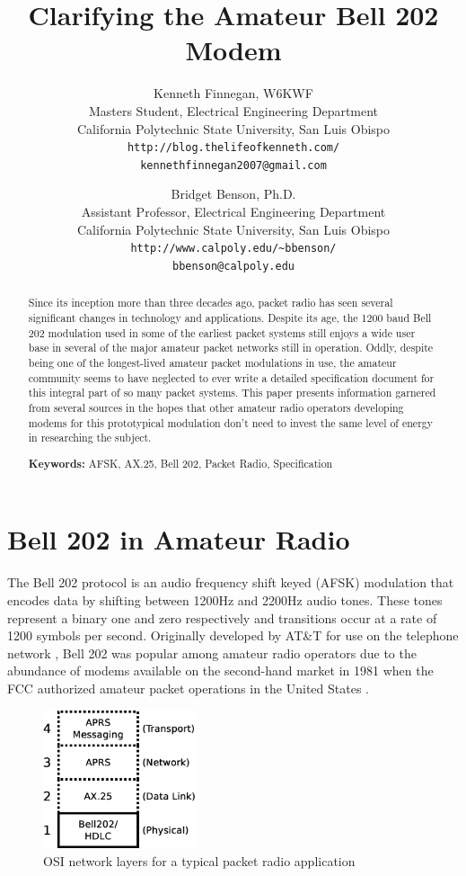 \documentclass[12pt,letterpaper]{article}
\title{Clarifying the Amateur Bell 202 Modem}
\author{Kenneth Finnegan, W6KWF\\
\small Masters Student, Electrical Engineering Department\\
\small California Polytechnic State University, San Luis Obispo\\
\small \texttt{http://blog.thelifeofkenneth.com/}\\
\small \texttt{kennethfinnegan2007@gmail.com}\\
\and
Bridget Benson, Ph.D.\\
\small Assistant Professor, Electrical Engineering Department\\
\small California Polytechnic State University, San Luis Obispo\\
\small \texttt{http://www.calpoly.edu/\textasciitilde{}bbenson/}\\
\small \texttt{bbenson@calpoly.edu}}
\begin{document}
\maketitle

\begin{abstract}
	Since its inception more than three decades ago, 
	packet radio has seen several significant changes in technology
	and applications. 
	Despite its age, the 1200 baud Bell 202 modulation used in some
	of the earliest packet systems still enjoys a wide user base
	in several of the major amateur packet networks still in operation.
	Oddly, despite being one of the longest-lived amateur packet modulations in use,
	the amateur community seems to have neglected to ever write a detailed
	specification document for this integral part of so many packet systems.
	This paper presents information garnered from several sources
	in the hopes that other amateur radio operators developing modems for 
	this prototypical modulation
	don't need to invest the same level of energy in researching the subject.
	
	
	\textbf{Keywords:} AFSK, AX.25, Bell 202, Packet Radio, Specification
\end{abstract}


\section{Bell 202 in Amateur Radio}
\label{sec:bell202history}

The Bell 202 protocol is an audio frequency shift keyed (AFSK) modulation that
encodes data by shifting between 1200Hz and 2200Hz audio tones.
These tones represent a binary one and zero respectively and transitions occur
at a rate of 1200 symbols per second.
Originally developed by AT\&T for use on the telephone network \cite{202tspec},
Bell 202 was popular among amateur radio operators due to the abundance
of modems available on the second-hand market in 1981 when the FCC authorized
amateur packet operations in the United States \cite{gatewaypacket}.

\begin{figure}
	\centering
	\includegraphics[width=0.4\textwidth]{src/dia/osi_bell202}
	\caption{OSI network layers for a typical packet radio application}
	\label{fig:osibell}
\end{figure}
\end{document}
